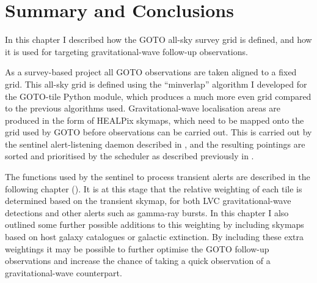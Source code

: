 \section{Summary and Conclusions}
\label{sec:tiling_conclusion}


\begin{colsection}

In this chapter I described how the GOTO all-sky survey grid is defined, and how it is used for targeting gravitational-wave follow-up observations.

As a survey-based project all GOTO observations are taken aligned to a fixed grid. This all-sky grid is defined using the ``minverlap'' algorithm I developed for the GOTO-tile Python module, which produces a much more even grid compared to the previous algorithms used. Gravitational-wave localisation areas are produced in the form of HEALPix skymaps, which need to be mapped onto the grid used by GOTO before observations can be carried out. This is carried out by the sentinel alert-listening daemon described in , and the resulting pointings are sorted and prioritised by the scheduler as described previously in .

The functions used by the sentinel to process transient alerts are described in the following chapter (). It is at this stage that the relative weighting of each tile is determined based on the transient skymap, for both LVC gravitational-wave detections and other alerts such as gamma-ray bursts. In this chapter I also outlined some further possible additions to this weighting by including skymaps based on host galaxy catalogues or galactic extinction. By including these extra weightings it may be possible to further optimise the GOTO follow-up observations and increase the chance of taking a quick observation of a gravitational-wave counterpart.

\end{colsection}

